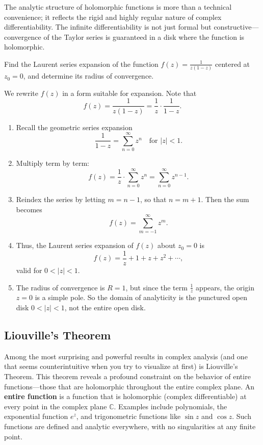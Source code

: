 \noindent The analytic structure of holomorphic functions is more than a technical convenience; it reflects the rigid and highly regular nature of complex differentiability. The infinite differentiability is not just formal but constructive—convergence of the Taylor series is guaranteed in a disk where the function is holomorphic.

\exampleline
\begin{example}
Find the Laurent series expansion of the function \(f(z) = \frac{1}{z(1 - z)}\) centered at \(z_0 = 0\), and determine its radius of convergence.
\begin{solution}
We rewrite \(f(z)\) in a form suitable for expansion. Note that
\[
f(z) = \frac{1}{z(1 - z)} = \frac{1}{z} \cdot \frac{1}{1 - z}.
\]

\begin{enumerate}
  \item Recall the geometric series expansion
  \[
  \frac{1}{1 - z} = \sum_{n=0}^{\infty} z^n \quad \text{for } |z| < 1.
  \]

  \item Multiply term by term:
  \[
  f(z) = \frac{1}{z} \cdot \sum_{n=0}^{\infty} z^n = \sum_{n=0}^{\infty} z^{n-1}.
  \]

  \item Reindex the series by letting \(m = n-1\), so that \(n = m+1\). Then the sum becomes
  \[
  f(z) = \sum_{m = -1}^{\infty} z^m.
  \]

  \item Thus, the Laurent series expansion of \(f(z)\) about \(z_0 = 0\) is
  \[
  f(z) = \frac{1}{z} + 1 + z + z^2 + \cdots,
  \]
  valid for \(0 < |z| < 1\).

  \item The radius of convergence is \(R = 1\), but since the term \(\frac{1}{z}\) appears, the origin \(z=0\) is a simple pole. So the domain of analyticity is the punctured open disk \(0 < |z| < 1\), not the entire open disk.
\end{enumerate}
\end{solution}
\end{example}
\exampleline


\subsection*{Liouville's Theorem} 

\noindent Among the most surprising and powerful results in complex analysis (and one that seems counterintuitive when you try to visualize at first) is Liouville's Theorem. This theorem reveals a profound constraint on the behavior of entire functions—those that are holomorphic throughout the entire complex plane. An \textbf{entire function} is a function that is holomorphic (complex differentiable) at every point in the complex plane $\mathbb{C}$. Examples include polynomials, the exponential function $e^z$, and trigonometric functions like $\sin z$ and $\cos z$. Such functions are defined and analytic everywhere, with no singularities at any finite point. \\

